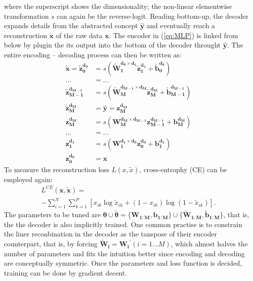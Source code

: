 \documentclass[twocolumn]{article}
\begin{document}
where the superscript shows the dimensionality; the non-linear elementwise transformation $s$ can again be the reverse-logit. Reading bottom-up, the decoder expands details from the abstracted concept ${\boldsymbol{\hat{y}}}$ and eventually reach a reconstruction $\boldsymbol{\tilde{x}}$ of the raw data  $\boldsymbol{x}$. The encoder in (\ref{eq:MLP}) is linked from below by plugin the its output into the bottom of the decoder throught ${\boldsymbol{\hat{y}}}$. The entire encoding -- decoding process can then be written as:
\begin{equation} \label{eq:SDA}
\begin{split}
  \boldsymbol{\tilde{x}}=
  \boldsymbol{\tilde{z}_{0  }^{d_{0  }}} &= s(\boldsymbol{\tilde{W}_{1  }^{d_{0  } \times d_{1  }} \tilde{z}_{1  }^{d_{1  }}}+\boldsymbol{\tilde{b}_{0  }^{d_{0  }}}) \\
  ... &= ... \\
  \boldsymbol{\tilde{z}_{M-1}^{d_{M-1}}} &= s(\boldsymbol{\tilde{W}_{M  }^{d_{M-1} \times d_{M  }} \tilde{z}_{M  }^{d_{M  }}}+\boldsymbol{\tilde{b}_{M-1}^{d_{M-1}}}) \\
  \boldsymbol{\tilde{z}_{M  }^{d_{M  }}} &= \boldsymbol{\hat{y}} = \boldsymbol{z_{M  }^{d_{M  }}} \\
  \boldsymbol{z_{M  }^{d_{M  }}}         &= s(\boldsymbol{W_{M  }^{d_{M  } \times d_{M-1}} z_{M-1}^{d_{M-1}}}+\boldsymbol{b_{M  }^{d_{M  }}}) \\
  ... &= ... \\
  \boldsymbol{z_{1  }^{d_{1  }}}         &= s(\boldsymbol{W_{1  }^{d_{1  } \times d_{0  }} z_{0  }^{d_{0  }}}+\boldsymbol{b_{1  }^{d_{1  }}}) \\
  \boldsymbol{z_{0  }^{d_{0  }}}         &= \boldsymbol{x}
\end{split}
\end{equation}
To measure the reconstruction loss $L(x,\tilde{x})$, cross-entrophy (CE) can be employed again:
\begin{equation*}
\begin{split}
  L^{CE}(\boldsymbol{x},\boldsymbol{\tilde{x}}) = \\
  -\sum_{i=1}^N\sum_{k=1}^P[x_{ik}\log{\tilde{x}_{ik}}+(1-x_{ik})\log(1-\tilde{x}_{ik})].
\end{split}
\end{equation*}
The parameters to be tuned are $\boldsymbol{\theta} \cup \boldsymbol{\tilde{\theta}}=\{\boldsymbol{W_{1:M}},\boldsymbol{b_{1:M}}\} \cup \{\boldsymbol{\tilde{W}_{1:M}}, \boldsymbol{\tilde{b}_{1:M}}\}$, that is, the the decoder is also implicitly trained. One common practise is to constrain the liner reconbination in the decoder as the tanspose of their encoder counterpart, that is, by forcing $\boldsymbol{\tilde{W}_i}=\boldsymbol{W_i}^{\prime} (i=1 \ldots M)$, which almost halves the number of parameters and fits the intuition better since encoding and decoding are conceptually symmetric. Once the parameters and loss function is decided, training can be done by gradient decent.
\end{document}
